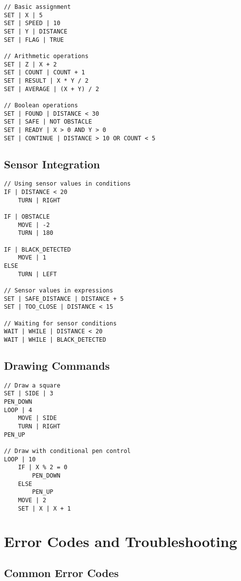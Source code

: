 \begin{lstlisting}[caption=Variable Operation Examples]
// Basic assignment
SET | X | 5
SET | SPEED | 10
SET | Y | DISTANCE
SET | FLAG | TRUE

// Arithmetic operations
SET | Z | X + 2
SET | COUNT | COUNT + 1
SET | RESULT | X * Y / 2
SET | AVERAGE | (X + Y) / 2

// Boolean operations
SET | FOUND | DISTANCE < 30
SET | SAFE | NOT OBSTACLE
SET | READY | X > 0 AND Y > 0
SET | CONTINUE | DISTANCE > 10 OR COUNT < 5
\end{lstlisting}

\subsection{Sensor Integration}

\begin{lstlisting}[caption=Sensor Integration Examples]
// Using sensor values in conditions
IF | DISTANCE < 20
    TURN | RIGHT

IF | OBSTACLE
    MOVE | -2
    TURN | 180

IF | BLACK_DETECTED
    MOVE | 1
ELSE
    TURN | LEFT

// Sensor values in expressions
SET | SAFE_DISTANCE | DISTANCE + 5
SET | TOO_CLOSE | DISTANCE < 15

// Waiting for sensor conditions
WAIT | WHILE | DISTANCE < 20
WAIT | WHILE | BLACK_DETECTED
\end{lstlisting}

\subsection{Drawing Commands}

\begin{lstlisting}[caption=Drawing Command Examples]
// Draw a square
SET | SIDE | 3
PEN_DOWN
LOOP | 4
    MOVE | SIDE
    TURN | RIGHT
PEN_UP

// Draw with conditional pen control
LOOP | 10
    IF | X % 2 = 0
        PEN_DOWN
    ELSE
        PEN_UP
    MOVE | 2
    SET | X | X + 1
\end{lstlisting}

\section{Error Codes and Troubleshooting}

\subsection{Common Error Codes}

